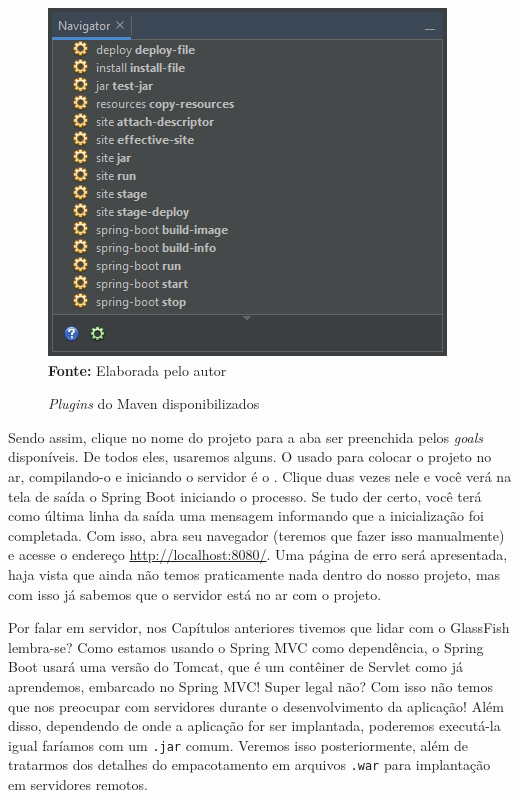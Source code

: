 \FloatBarrier
\begin{figure}[!htbp]
    \centering
    \caption{\textit{Plugins} do Maven disponibilizados}
    \includegraphics[scale=1]{imagens/cap10PluginsMaven}
    \\\textbf{Fonte:} Elaborada pelo autor
    \label{fig:cap10PluginsMaven}
\end{figure}
\FloatBarrier

Sendo assim, clique no nome do projeto para a aba  ser preenchida pelos \textit{goals} disponíveis. De todos eles, usaremos alguns. O usado para colocar o projeto no ar, compilando-o e iniciando o servidor é o . Clique duas vezes nele e você verá na tela de saída o Spring Boot iniciando o processo. Se tudo der certo, você terá como última linha da saída uma mensagem informando que a inicialização foi completada. Com isso, abra seu navegador (teremos que fazer isso manualmente) e acesse o endereço \url{http://localhost:8080/}. Uma página de erro será apresentada, haja vista que ainda não temos praticamente nada dentro do nosso projeto, mas com isso já sabemos que o servidor está no ar com o projeto.

Por falar em servidor, nos Capítulos anteriores tivemos que lidar com o GlassFish lembra-se? Como estamos usando o Spring MVC como dependência, o Spring Boot usará uma versão do Tomcat, que é um contêiner de Servlet como já aprendemos, embarcado no Spring MVC! Super legal não? Com isso não temos que nos preocupar com servidores durante o desenvolvimento da aplicação! Além disso, dependendo de onde a aplicação for ser implantada, poderemos executá-la igual faríamos com um \texttt{.jar} comum. Veremos isso posteriormente, além de tratarmos dos detalhes do empacotamento em arquivos \texttt{.war} para implantação em servidores remotos.

